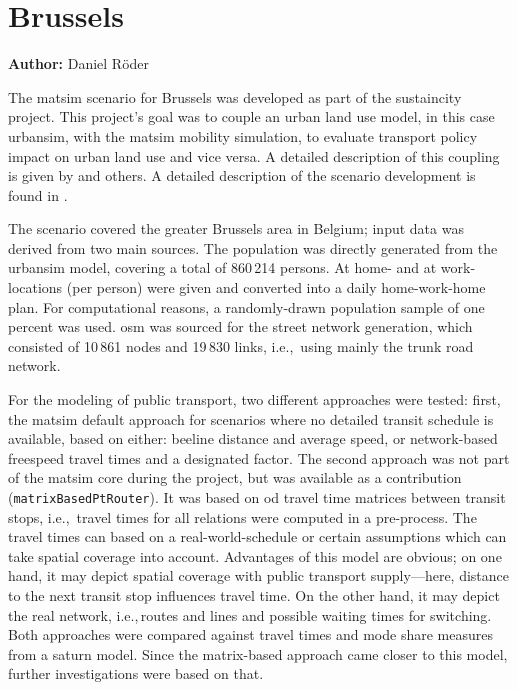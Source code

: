 \section{Brussels}
\label{sec:brussels}
\hfill \textbf{Author:} Daniel Röder


The \gls{matsim} scenario for Brussels was developed as part of the \gls{sustaincity} project. This project's goal was to couple an urban land use model, in this case \gls{urbansim}, with the \gls{matsim} mobility simulation, to evaluate transport policy impact on urban land use and vice versa. A detailed description of this coupling is given by \citet{Nicolai2013PhD} and others. A detailed description of the scenario development is found in \citet{RoederNagel2013SketchPlanningBrussels}.

The scenario covered the greater Brussels area in Belgium; input data was derived from two main sources. The population was directly generated from the \gls{urbansim} model, covering a total of 860\,214 persons. At home- and at work-locations (per person) were given and converted into a daily home-work-home plan. For computational reasons, a randomly-drawn population sample of one percent was used. \gls{osm} was sourced for the street network generation, which consisted of 10\,861 nodes and 19\,830 links, i.e.,\ using mainly the trunk road network.

For the modeling of public transport, two different approaches were tested:  first, the \gls{matsim} default approach for scenarios where no detailed transit schedule is available, based on either: beeline distance and average speed, or network-based freespeed travel times and a designated factor. The second approach was not part of the \gls{matsim} core during the project, but was available as a contribution (\lstinline|matrixBasedPtRouter|). It was based on \gls{od} travel time matrices between transit stops, i.e.,\ travel times for all relations were computed in a pre-process. The travel times can based on a real-world-schedule or certain assumptions which can take spatial coverage into account. Advantages of this model are obvious; on one hand, it may depict spatial coverage with public transport supply---here, distance to the next transit stop influences travel time. On the other hand, it may depict the real network, i.e.,\,routes and lines and possible waiting times for switching. Both approaches were compared against travel times and mode share measures from a \gls{saturn} model. Since the matrix-based approach came closer to this model, further investigations were based on that.

